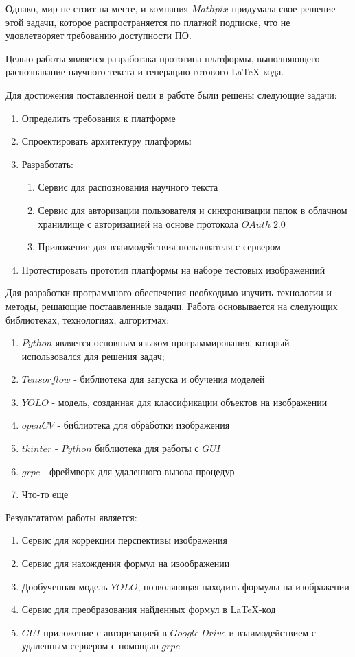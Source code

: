 Однако, мир не стоит на месте, и компания $Mathpix$ придумала свое решение \cite{mathpix} этой задачи, которое распространяется по платной подписке, что не удовлетворяет требованию доступности ПО.

Целью работы является разработака прототипа платформы, выполняющего распознавание научного текста и  генерацию готового LaTeX кода.

Для достижения поставленной цели в работе были решены следующие задачи:
\begin{enumerate}
    \item Определить требования к платформе
    \item Спроектировать архитектуру платформы
    \item Разработать:
        \begin{enumerate}
            \item Сервис для распознования научного текста
            \item Сервис для авторизации пользователя и синхронизации папок в облачном хранилище с авторизацией на основе протокола $OAuth\; 2.0$
            \item Приложение для взаимодействия пользователя с сервером
        \end{enumerate}
    \item Протестировать прототип платформы на наборе тестовых изображениий
\end{enumerate}

Для разработки программного обеспечения необходимо изучить технологии и методы, решающие постаавленные задачи. Работа основывается на следующих библиотеках, технологиях, алгоритмах:
\begin{enumerate}
    \item $Python$ является основным языком программирования, который использовался для решения задач;
    \item $Tensorflow$ - библиотека для запуска и обучения моделей
    \item $YOLO$ - модель, созданная для классификации объектов на изображении
    \item $openCV$ - библиотека для обработки изображения
    \item $tkinter$ - $Python$ библиотека для работы с $GUI$
    \item $grpc$ - фреймворк для удаленного вызова процедур
    \item Что-то еще
\end{enumerate}

Результататом работы является:
\begin{enumerate}
    \item Сервис для коррекции перспективы изображения
    \item Сервис для нахождения формул на изоображении
    \item Дообученная модель $YOLO$, позволяющая находить формулы на изображении
    \item Сервис для преобразования найденных формул в \LaTeX-код
    \item $GUI$ приложение с авторизацией в $Google\: Drive$ и взаимодействием с удаленным сервером с помощью $grpc$
\end{enumerate}